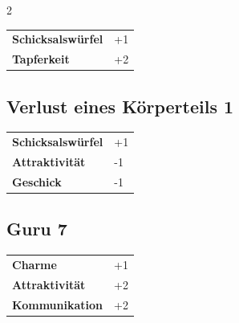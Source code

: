 \begin{multicols}{2}
\begin{tcolorbox}
\begin{tabular}{@{}ll@{}}
    \textbf{Schicksalswürfel} & +1\\
    \textbf{Tapferkeit} & +2\\
\end{tabular}


\end{tcolorbox}

\begin{tcolorbox}
    \subsection*{Verlust eines Körperteils \hfill \small{1 }}
    \tcblower




\begin{tabular}{@{}ll@{}}
    \textbf{Schicksalswürfel} & +1\\
    \textbf{Attraktivität} & -1\\
    \textbf{Geschick} & -1\\
\end{tabular}


\end{tcolorbox}

\begin{tcolorbox}
    \subsection*{Guru \hfill \small{7 }}
    \tcblower




\begin{tabular}{@{}ll@{}}
    \textbf{Charme} & +1\\
    \textbf{Attraktivität} & +2\\
    \textbf{Kommunikation} & +2\\
\end{tabular}



\end{tcolorbox}
\end{multicols}
